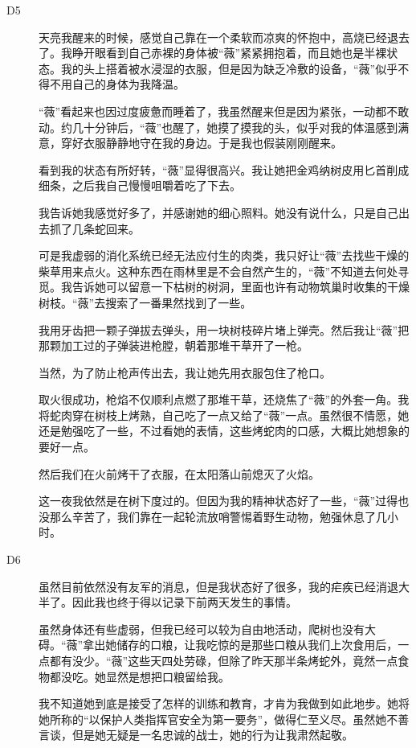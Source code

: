 \begin{description}
\item[D5]

天亮我醒来的时候，感觉自己靠在一个柔软而凉爽的怀抱中，高烧已经退去了。我睁开眼看到自己赤裸的身体被“薇”紧紧拥抱着，而且她也是半裸状态。我的头上搭着被水浸湿的衣服，但是因为缺乏冷敷的设备，“薇”似乎不得不用自己的身体为我降温。

“薇”看起来也因过度疲惫而睡着了，我虽然醒来但是因为紧张，一动都不敢动。约几十分钟后，“薇”也醒了，她摸了摸我的头，似乎对我的体温感到满意，穿好衣服静静地守在我的身边。于是我也假装刚刚醒来。

看到我的状态有所好转，“薇”显得很高兴。我让她把金鸡纳树皮用匕首削成细条，之后我自己慢慢咀嚼着吃了下去。

我告诉她我感觉好多了，并感谢她的细心照料。她没有说什么，只是自己出去抓了几条蛇回来。

可是我虚弱的消化系统已经无法应付生的肉类，我只好让“薇”去找些干燥的柴草用来点火。这种东西在雨林里是不会自然产生的，“薇”不知道去何处寻觅。我告诉她可以留意一下枯树的树洞，里面也许有动物筑巢时收集的干燥树枝。“薇”去搜索了一番果然找到了一些。

我用牙齿把一颗子弹拔去弹头，用一块树枝碎片堵上弹壳。然后我让“薇”把那颗加工过的子弹装进枪膛，朝着那堆干草开了一枪。

当然，为了防止枪声传出去，我让她先用衣服包住了枪口。

取火很成功，枪焰不仅顺利点燃了那堆干草，还烧焦了“薇”的外套一角。我将蛇肉穿在树枝上烤熟，自己吃了一点又给了“薇”一点。虽然很不情愿，她还是勉强吃了一些，不过看她的表情，这些烤蛇肉的口感，大概比她想象的要好一点。

然后我们在火前烤干了衣服，在太阳落山前熄灭了火焰。

这一夜我依然是在树下度过的。但因为我的精神状态好了一些，“薇”过得也没那么辛苦了，我们靠在一起轮流放哨警惕着野生动物，勉强休息了几小时。

\item[D6]

虽然目前依然没有友军的消息，但是我状态好了很多，我的疟疾已经消退大半了。因此我也终于得以记录下前两天发生的事情。

虽然身体还有些虚弱，但我已经可以较为自由地活动，爬树也没有大碍。“薇”拿出她储存的口粮，让我吃惊的是那些口粮从我们上次食用后，一点都有没少。“薇”这些天四处劳碌，但除了昨天那半条烤蛇外，竟然一点食物都没吃。她显然是想把口粮留给我。

我不知道她到底是接受了怎样的训练和教育，才肯为我做到如此地步。她将她所称的“以保护人类指挥官安全为第一要务”，做得仁至义尽。虽然她不善言谈，但是她无疑是一名忠诚的战士，她的行为让我肃然起敬。


\end{description}
